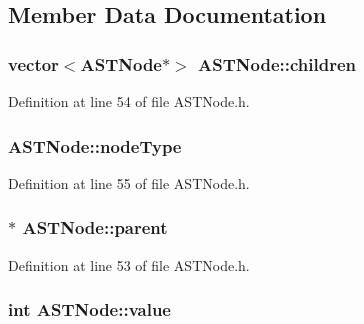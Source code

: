 \subsection{Member Data Documentation}
\hypertarget{class_a_s_t_node_af8f4491cf9294805337542d5873c85b2}{
\subsubsection[{children}]{\setlength{\rightskip}{0pt plus 5cm}vector$<${\bf A\-S\-T\-Node}$\ast$$>$ A\-S\-T\-Node\-::children\hspace{0.3cm}{\ttfamily [protected]}}}\label{class_a_s_t_node_af8f4491cf9294805337542d5873c85b2}


Definition at line 54 of file A\-S\-T\-Node.\-h.

\hypertarget{class_a_s_t_node_a15fcdbd8403a1169b06d948a827fde55}{
\subsubsection[{node\-Type}]{ A\-S\-T\-Node\-::node\-Type\hspace{0.3cm}{\ttfamily [protected]}}}\label{class_a_s_t_node_a15fcdbd8403a1169b06d948a827fde55}


Definition at line 55 of file A\-S\-T\-Node.\-h.

\hypertarget{class_a_s_t_node_aaa1e479bfeb485d93a4866f9c2daf171}{
\subsubsection[{parent}]{$\ast$ A\-S\-T\-Node\-::parent\hspace{0.3cm}{\ttfamily [protected]}}}\label{class_a_s_t_node_aaa1e479bfeb485d93a4866f9c2daf171}


Definition at line 53 of file A\-S\-T\-Node.\-h.

\hypertarget{class_a_s_t_node_a136d1712e8cfdeb4908aceb22abc3de7}{
\subsubsection[{value}]{\setlength{\rightskip}{0pt plus 5cm}int A\-S\-T\-Node\-::value\hspace{0.3cm}{\ttfamily [protected]}}}\label{class_a_s_t_node_a136d1712e8cfdeb4908aceb22abc3de7}


